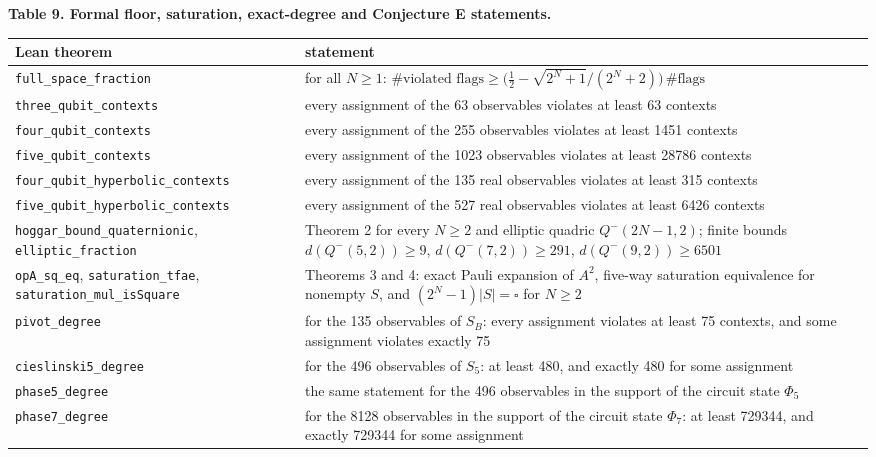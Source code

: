 \documentclass[11pt,a4paper]{article}
\begin{document}
\textbf{Table 9. Formal floor, saturation, exact-degree and Conjecture E statements.}

{\def\LTcaptype{none} %
{\small
\begin{longtable}[]{@{}>{\raggedright\arraybackslash}p{}>{\raggedright\arraybackslash}p{}@{}}
\toprule\noalign{}
Lean theorem & statement \\
\midrule\noalign{}
\endhead
\bottomrule\noalign{}
\endlastfoot
\nolinkurl{full_space_fraction} & for all \(N \ge 1\): \(\#\text{violated flags} \ge \big(\tfrac12 - \sqrt{2^N+1}/(2^N+2)\big)\,\#\text{flags}\) \\
\nolinkurl{three_qubit_contexts} & every assignment of the 63 observables violates at least 63 contexts \\
\nolinkurl{four_qubit_contexts} & every assignment of the 255 observables violates at least 1451 contexts \\
\nolinkurl{five_qubit_contexts} & every assignment of the 1023 observables violates at least 28786 contexts \\
\nolinkurl{four_qubit_hyperbolic_contexts} & every assignment of the 135 real observables violates at least 315 contexts \\
\nolinkurl{five_qubit_hyperbolic_contexts} & every assignment of the 527 real observables violates at least 6426 contexts \\
\nolinkurl{hoggar_bound_quaternionic}, \texttt{elliptic\_fraction} & Theorem 2 for every \(N \ge 2\) and elliptic quadric \(Q^-(2N-1,2)\); finite bounds \(d(Q^-(5,2))\ge9\), \(d(Q^-(7,2))\ge291\), \(d(Q^-(9,2))\ge6501\) \\
\texttt{opA\_sq\_eq}, \texttt{saturation\_tfae}, \nolinkurl{saturation_mul_isSquare} & Theorems 3 and 4: exact Pauli expansion of \(A^2\), five-way saturation equivalence for nonempty \(S\), and \((2^N-1)\vert S\vert=\square\) for \(N\ge2\) \\
\texttt{pivot\_degree} & for the 135 observables of \(S_B\): every assignment violates at least 75 contexts, and some assignment violates exactly 75 \\
\nolinkurl{cieslinski5_degree} & for the 496 observables of \(S_5\): at least 480, and exactly 480 for some assignment \\
\texttt{phase5\_degree} & the same statement for the 496 observables in the support of the circuit state \(\Phi_5\) \\
\texttt{phase7\_degree} & for the 8128 observables in the support of the circuit state \(\Phi_7\): at least 729344, and exactly 729344 for some assignment \\

\end{longtable}}}
\end{document}
